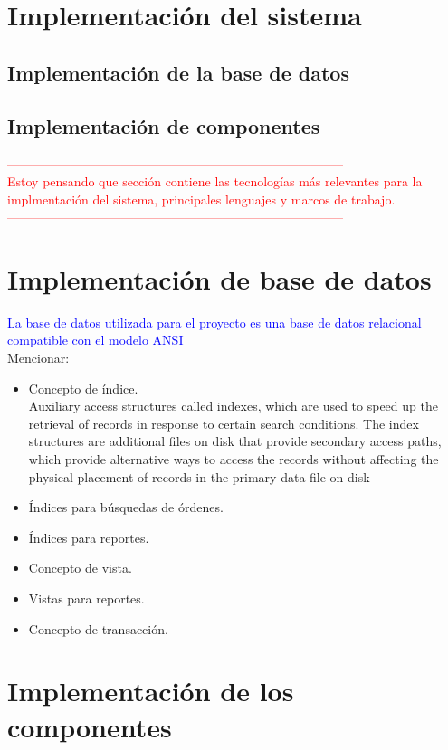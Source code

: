 \section{Implementación del sistema}
\subsection{Implementación de la base de datos}
\subsection{Implementación de componentes}

\textcolor{red}{
--------------------------------------------------------------------------------\\
Estoy pensando que sección contiene las tecnologías más relevantes para la implmentación del sistema, principales lenguajes y marcos de trabajo.\\
--------------------------------------------------------------------------------}

\section{Implementación de base de datos}
\textcolor{blue}{La base de datos utilizada para el proyecto es una base de datos relacional compatible con el modelo ANSI}\\
Mencionar: 
\begin{itemize}
	\item Concepto de índice.\\
	Auxiliary access structures called indexes, which are used to speed up the retrieval of records in response to certain search conditions. The index structures are additional files on disk that provide secondary access paths, which provide alternative ways to access the records without affecting the physical placement of records in the primary data file on disk
	\cite{FundamentalsOfDBSystems}



	\item Índices para búsquedas de órdenes.
	\item Índices para reportes.
	\item Concepto de vista.
	\item Vistas para reportes.
	\item Concepto de transacción.
\end{itemize}


\section{Implementación de los componentes}

